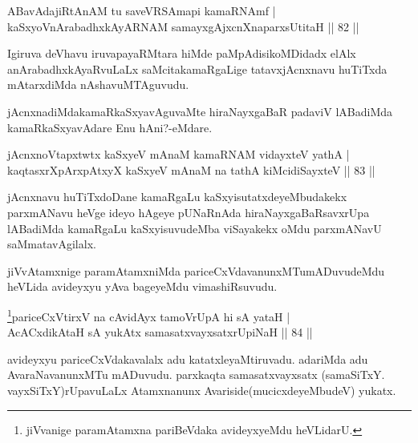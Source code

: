 \begin{shl}
ABavAdajiRtAnAM tu saveVRSAmapi kamaRNAmf |\\
kaSxyoV\s nArabadhxkAyARNAM samayxgAjxcnXnaparxsUtitaH \hfill || 82 ||
\end{shl}

\begin{artha}
Igiruva deVhavu iruvapayaRMtara hiMde paMpAdisikoMDidadx elAlx  anArabadhxkAyaRvuLaLx saMcitakamaRgaLige tatavxjAcnxnavu huTiTxda mAtarxdiMda nAshavuMTAguvudu.
\end{artha}

\begin{artha}
jAcnxnadiMdakamaRkaSxyavAguvaMte hiraNayxgaBaR padaviV lABadiMda kamaRkaSxyavAdare Enu hAni?-eMdare.
\end{artha}


\begin{shl}
jAcnxnoVtapxtwtx kaSxyeV mAnaM kamaRNAM vidayxteV yathA |\\
kaqtasxrXpArxpAtxyX kaSxyeV mAnaM na tathA kiMcidiSayxteV \hfill || 83 ||
\end{shl}

\begin{artha}
jAcnxnavu huTiTxdoDane kamaRgaLu kaSxyisutatxdeyeMbudakekx parxmANavu heVge ideyo hAgeye pUNaRnAda hiraNayxgaBaRsavxrUpa lABadiMda kamaRgaLu kaSxyisuvudeMba viSayakekx oMdu parxmANavU saMmatavAgilalx.
\end{artha}

\begin{artha}
jiVvAtamxnige paramAtamxniMda pariceCxVdavanunxMTumADuvudeMdu heVLida avideyxyu yAva bageyeMdu vimashiRsuvudu.
\end{artha}


\begin{shl}
\footnote{jiVvanige paramAtamxna pariBeVdaka avideyxyeMdu heVLidarU.}pariceCxVtirxV na cAvidAyx tamoVrUpA hi sA yataH |\\
AcACxdikA\s taH sA yukAtx samasatxvayxsatxrUpiNaH \hfill || 84 ||
\end{shl}

\begin{artha}
avideyxyu pariceCxVdakavalalx adu katatxleyaMtiruvadu. adariMda adu AvaraNavanunxMTu mADuvudu. parxkaqta samasatxvayxsatx (samaSiTxY. vayxSiTxY)rUpavuLaLx Atamxnanunx Avariside(mucicxdeyeMbudeV) yukatx.
\end{artha}

